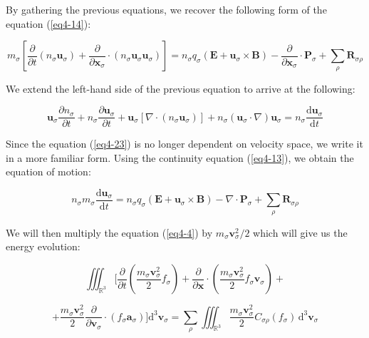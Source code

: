 By gathering the previous equations, we recover the following form of the equation (\ref{eq4-14}):

\begin{equation}
    \label{eq4-23}
    m_\sigma\left[\frac{\partial}{\partial t}\left(n_\sigma\mathbf{u}_\sigma\right)+\frac{\partial}{\partial\mathbf{x}_\sigma}\cdot\left(n_\sigma\mathbf{u}_\sigma\mathbf{u}_\sigma\right)\right]=n_\sigma q_\sigma\left(\mathbf{E}+\mathbf{u}_\sigma\times\mathbf{B}\right)-\frac{\partial}{\partial\mathbf{x}_\sigma}\cdot\mathbf{P}_\sigma+\sum_{\rho}\mathbf{R}_{\sigma\rho}
\end{equation}

We extend the left-hand side of the previous equation to arrive at the following:

\begin{equation}
    \mathbf{u}_\sigma\frac{\partial n_\sigma}{\partial t}+n_\sigma\frac{\partial\mathbf{u}_\sigma}{\partial t}+\mathbf{u}_\sigma\left[\nabla\cdot(n_\sigma\mathbf{u}_\sigma)\right]+n_\sigma(\mathbf{u}_\sigma\cdot\nabla)\mathbf{u}_\sigma=n_\sigma\frac{\mathrm{d}\mathbf{u}_\sigma}{\mathrm{d}t}
\end{equation}

Since the equation (\ref{eq4-23}) is no longer dependent on velocity space, we write it in a more familiar form. Using the continuity equation (\ref{eq4-13}), we obtain the equation of motion:

\begin{equation}
    \label{eq4-25}
    n_\sigma m_\sigma\frac{\mathrm{d}\mathbf{u}_\sigma}{\mathrm{d}t}=n_\sigma q_\sigma\left(\mathbf{E}+\mathbf{u}_\sigma\times\mathbf{B}\right)-\nabla\cdot\mathbf{P}_\sigma+\sum_{\rho}\mathbf{R}_{\sigma\rho}
\end{equation}

We will then multiply the equation (\ref{eq4-4}) by $m_\sigma\mathbf{v}_\sigma^2/2$ which will give us the energy evolution:

\begin{equation*}
    \iiint_{\mathbb{R}^3}\Bigg[\frac{\partial}{\partial t}\left(\frac{m_\sigma\mathbf{v}_\sigma^2}{2}f_\sigma\right)+\frac{\partial}{\partial\mathbf{x}}\cdot\left(\frac{m_\sigma\mathbf{v}_\sigma^2}{2}f_\sigma\mathbf{v}_\sigma\right)+
\end{equation*}

\begin{equation}
    \label{eq4-26}
    +\frac{m_\sigma\mathbf{v}_\sigma^2}{2}\frac{\partial}{\partial\mathbf{v}_\sigma}\cdot\left(f_\sigma\mathbf{a}_\sigma\right)\Bigg]\mathrm{d}^3\mathbf{v}_\sigma=\sum_{\rho}\iiint_{\mathbb{R}^3}\frac{m_\sigma\mathbf{v}_\sigma^2}{2}C_{\sigma\rho}(f_\sigma)\,\mathrm{d}^3\mathbf{v}_\sigma
\end{equation}

